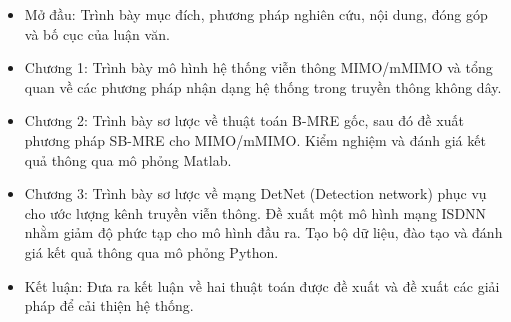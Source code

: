 \renewcommand{\labelitemi}{$-$}
\begin{itemize}
	\item Mở đầu: Trình bày mục đích, phương pháp nghiên cứu, nội dung, đóng góp và bố cục của luận văn.
	\item Chương 1: Trình bày mô hình hệ thống viễn thông MIMO/mMIMO và tổng quan về các phương pháp nhận dạng hệ thống trong truyền thông không dây.
	\item Chương 2: Trình bày sơ lược về thuật toán B-MRE gốc, sau đó đề xuất phương pháp SB-MRE cho MIMO/mMIMO. Kiểm nghiệm và đánh giá kết quả thông qua mô phỏng Matlab.
	\item Chương 3: Trình bày sơ lược về mạng DetNet (Detection network) phục vụ cho ước lượng kênh truyền viễn thông. Đề xuất một mô hình mạng ISDNN nhằm giảm độ phức tạp cho mô hình đầu ra. Tạo bộ dữ liệu, đào tạo và đánh giá kết quả thông qua mô phỏng Python.
	\item Kết luận: Đưa ra kết luận về hai thuật toán được đề xuất và đề xuất các giải pháp để cải thiện hệ thống.
\end{itemize} 